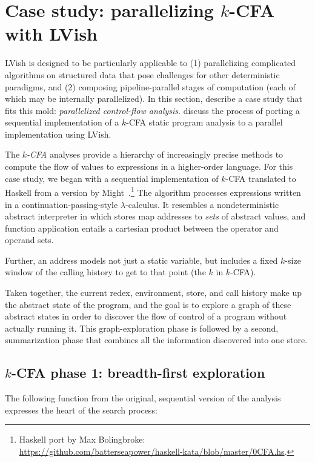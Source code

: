 \section{Case study: parallelizing $k$-CFA with LVish}\label{s:lvish-k-cfa}

LVish is designed to be particularly applicable to (1) parallelizing
complicated algorithms on structured data that pose challenges for
other deterministic paradigms, and (2) composing pipeline-parallel
stages of computation (each of which may be internally parallelized).
In this section,  describe a case study that fits this mold:
\emph{parallelized control-flow analysis}.   discuss the process of
porting a sequential implementation of a $k$-CFA static program
analysis to a parallel implementation using LVish.

The \emph{$k$-CFA} analyses provide a hierarchy of increasingly
precise methods to compute the flow of values to expressions in a
higher-order language.  For this case study, we began with a
sequential implementation of $k$-CFA translated to Haskell from a
version by Might~.\footnote{Haskell port by Max
  Bolingbroke:
  \url{https://github.com/batterseapower/haskell-kata/blob/master/0CFA.hs}.}
The algorithm processes expressions written in a
continuation-passing-style $\lambda$-calculus.  It resembles a
nondeterministic abstract interpreter in which stores map addresses to
\emph{sets} of abstract values, and function application entails a
cartesian product between the operator and operand sets.

Further, an address models not just a static variable, but includes a
fixed $k$-size window of the calling history to get to that point (the
$k$ in $k$-CFA).

Taken together, the current redex, environment, store, and call
history make up the abstract state of the program, and the goal is to
explore a graph of these abstract states in order to discover the flow
of control of a program without actually running it.  This
graph-exploration phase is followed by a second, summarization phase
that combines all the information discovered into one store.

\subsection{$k$-CFA phase 1: breadth-first exploration}

The following function from the original, sequential version of the
analysis expresses the heart of the search process:

